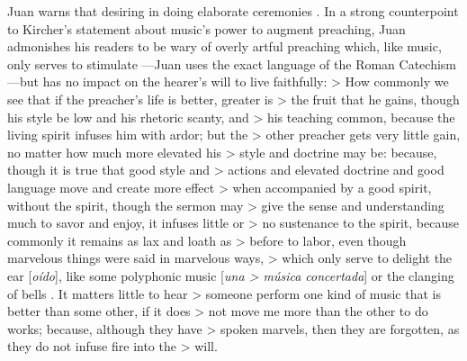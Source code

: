 Juan warns that desiring  in doing elaborate ceremonies .
\Autocite[bk. 3, ch. 43, p. 420:  .]{JuandelaCruz:Subida}
In a strong counterpoint to Kircher's statement about music's power to augment preaching, Juan admonishes his readers to be wary of overly artful preaching which, like music, only serves to stimulate ---Juan uses the exact language of the Roman Catechism---but has no impact on the hearer's will to live faithfully:
> How commonly we see that \Dots{} if the preacher's life is better, greater is > the fruit that he gains, though his style be low and his rhetoric scanty, and > his teaching common, because the living spirit infuses him with ardor; but the > other preacher gets very little gain, no matter how much more elevated his > style and doctrine may be: because, though it is true that good style and > actions and elevated doctrine and good language move and create more effect > when accompanied by a good spirit, without the spirit, though the sermon may > give the sense and understanding much to savor and enjoy, it infuses little or > no sustenance to the spirit, because commonly it remains as lax and loath as > before to labor, even though marvelous things were said in marvelous ways, > which only serve to delight the ear [\emph{oído}], like some polyphonic music [\emph{una > música concertada}] or the clanging of bells \Dots{}. It matters little to hear > someone perform one kind of music that is better than some other, if it does > not move me more than the other to do works; because, although they have > spoken marvels, then they are forgotten, as they do not infuse fire into the > will.
